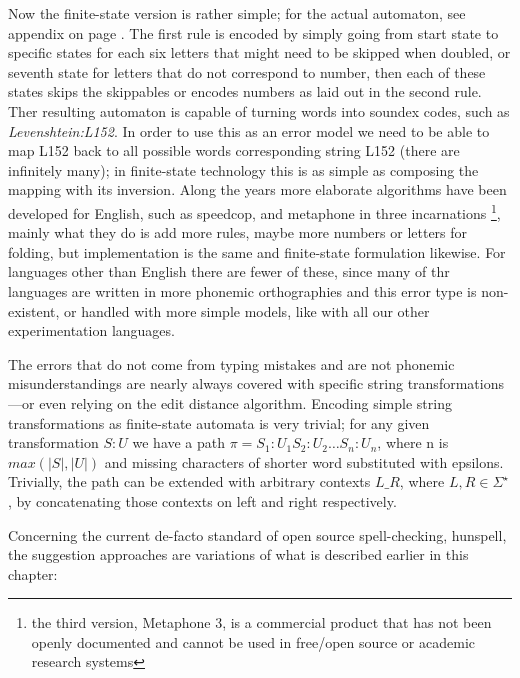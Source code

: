 \documentclass[a4paper,12pt]{article}
\begin{document}
Now the finite-state version is rather simple; for the actual automaton, see
appendix on page \pageref{appendix:soundex}. The first rule is encoded by
simply going from start state to specific states for each six letters that
might need to be skipped when doubled, or seventh state for letters that do not
correspond to number, then each of these states skips the skippables or encodes
numbers as laid out in the second rule. Ther resulting automaton is capable of
turning words into soundex codes, such as \emph{Levenshtein:L152}. In order to
use this as an error model we need to be able to map L152 back to all possible
words corresponding string L152 (there are infinitely many); in finite-state
technology this is as simple as composing the mapping with its inversion. Along
the years more elaborate algorithms have been developed for English, such as
speedcop, and metaphone in three
incarnations \cite[]{philips1990hanging,philips2000double}\footnote{the third
    version, Metaphone 3, is a commercial product that has not been openly
    documented and cannot be used in free/open source or academic research
systems}, mainly what they do is add more rules, maybe more numbers or letters
for folding, but implementation is the same and finite-state formulation
likewise. For languages other than English there are fewer of these, since many
of thr languages are written in more phonemic orthographies and this error type
is non-existent, or handled with more simple models, like with all our other
experimentation languages.

The errors that do not come from typing mistakes and are not phonemic
misunderstandings are nearly always covered with specific string
transformations---or even relying on the edit distance algorithm. Encoding
simple string transformations as finite-state automata is very trivial; for any
given transformation $S:U$ we have a path $\pi = S_1:U_1 S_2:U_2 \ldots
S_n:U_n$, where n is $max(|S|, |U|)$ and missing characters of shorter word
substituted with epsilons. Trivially, the path can be extended with arbitrary
contexts $L \_ R$, where $L, R \in \Sigma^{\star}$, by concatenating those
contexts on left and right respectively. 

Concerning the current de-facto standard of open source spell-checking,
hunspell, the suggestion approaches are variations of what is described earlier
in this chapter:
\end{document}

